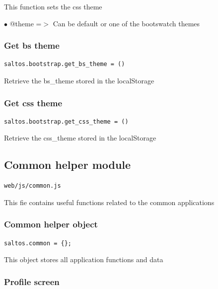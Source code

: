 \documentclass[a4paper]{article}
\begin{document}
This function sets the css theme

\begin{compactitem}
\item[\color{myblue}$\bullet$] @theme =$>$ Can be default or one of the bootswatch themes
\end{compactitem}

\hypertarget{toc114}{}
\subsubsection{Get bs theme}

\begin{lstlisting}
saltos.bootstrap.get_bs_theme = ()
\end{lstlisting}

Retrieve the bs\_theme stored in the localStorage

\hypertarget{toc115}{}
\subsubsection{Get css theme}

\begin{lstlisting}
saltos.bootstrap.get_css_theme = ()
\end{lstlisting}

Retrieve the css\_theme stored in the localStorage

\hypertarget{toc116}{}
\subsection{Common helper module}

\begin{lstlisting}
web/js/common.js
\end{lstlisting}

This fie contains useful functions related to the common applications

\hypertarget{toc117}{}
\subsubsection{Common helper object}

\begin{lstlisting}
saltos.common = {};
\end{lstlisting}

This object stores all application functions and data

\hypertarget{toc118}{}
\subsubsection{Profile screen}
\end{document}
